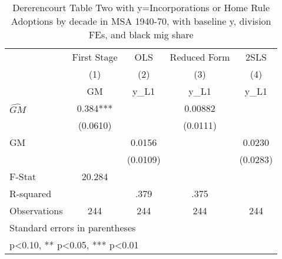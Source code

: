 \begin{table}[htbp]\centering
\def\sym#1{\ifmmode^{#1}\else\(^{#1}\)\fi}
\caption{Dererencourt Table Two with y=Incorporations or Home Rule Adoptions by decade in MSA 1940-70, with baseline y, division FEs, and black mig share}
\begin{tabular}{l*{4}{c}}
\toprule
                    & First Stage   &         OLS   &Reduced Form   &        2SLS   \\
                    &\multicolumn{1}{c}{(1)}&\multicolumn{1}{c}{(2)}&\multicolumn{1}{c}{(3)}&\multicolumn{1}{c}{(4)}\\
                    &\multicolumn{1}{c}{GM}&\multicolumn{1}{c}{y\_L1}&\multicolumn{1}{c}{y\_L1}&\multicolumn{1}{c}{y\_L1}\\
\midrule
$\hat{GM}$          &       0.384***&               &     0.00882   &               \\
                    &    (0.0610)   &               &    (0.0111)   &               \\
\addlinespace
GM                  &               &      0.0156   &               &      0.0230   \\
                    &               &    (0.0109)   &               &    (0.0283)   \\
\midrule
F-Stat              &      20.284   &               &               &               \\
R-squared           &               &        .379   &        .375   &               \\
Observations        &         244   &         244   &         244   &         244   \\
\bottomrule
\multicolumn{5}{l}{\footnotesize Standard errors in parentheses}\\
\multicolumn{5}{l}{\footnotesize * p<0.10, ** p<0.05, *** p<0.01}\\
\end{tabular}
\end{table}
